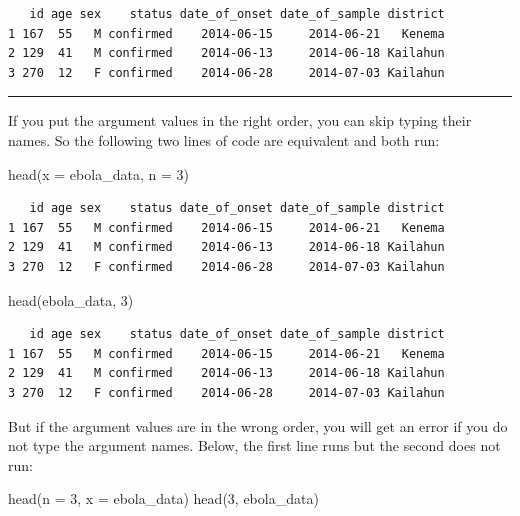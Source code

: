 \documentclass[
  letterpaper,
  DIV=11,
  numbers=noendperiod]{scrreprt}
\newenvironment{Shaded}{\begin{snugshade}}{\end{snugshade}}
\newcommand{\AttributeTok}[1]{\textcolor[rgb]{0.40,0.45,0.13}{#1}}
\newcommand{\DecValTok}[1]{\textcolor[rgb]{0.68,0.00,0.00}{#1}}
\newcommand{\FunctionTok}[1]{\textcolor[rgb]{0.28,0.35,0.67}{#1}}
\newcommand{\NormalTok}[1]{\textcolor[rgb]{0.00,0.23,0.31}{#1}}
\begin{document}
\begin{verbatim}
   id age sex    status date_of_onset date_of_sample district
1 167  55   M confirmed    2014-06-15     2014-06-21   Kenema
2 129  41   M confirmed    2014-06-13     2014-06-18 Kailahun
3 270  12   F confirmed    2014-06-28     2014-07-03 Kailahun
\end{verbatim}

\begin{center}\rule{0.5\linewidth}{0.5pt}\end{center}

If you put the argument values in the right order, you can skip typing
their names. So the following two lines of code are equivalent and both
run:

\begin{Shaded}
\begin{Highlighting}[]
\FunctionTok{head}\NormalTok{(}\AttributeTok{x =}\NormalTok{ ebola\_data, }\AttributeTok{n =} \DecValTok{3}\NormalTok{)}
\end{Highlighting}
\end{Shaded}

\begin{verbatim}
   id age sex    status date_of_onset date_of_sample district
1 167  55   M confirmed    2014-06-15     2014-06-21   Kenema
2 129  41   M confirmed    2014-06-13     2014-06-18 Kailahun
3 270  12   F confirmed    2014-06-28     2014-07-03 Kailahun
\end{verbatim}

\begin{Shaded}
\begin{Highlighting}[]
\FunctionTok{head}\NormalTok{(ebola\_data, }\DecValTok{3}\NormalTok{)}
\end{Highlighting}
\end{Shaded}

\begin{verbatim}
   id age sex    status date_of_onset date_of_sample district
1 167  55   M confirmed    2014-06-15     2014-06-21   Kenema
2 129  41   M confirmed    2014-06-13     2014-06-18 Kailahun
3 270  12   F confirmed    2014-06-28     2014-07-03 Kailahun
\end{verbatim}

But if the argument values are in the wrong order, you will get an error
if you do not type the argument names. Below, the first line runs but
the second does not run:

\begin{Shaded}
\begin{Highlighting}[]
\FunctionTok{head}\NormalTok{(}\AttributeTok{n =} \DecValTok{3}\NormalTok{, }\AttributeTok{x =}\NormalTok{ ebola\_data)}
\FunctionTok{head}\NormalTok{(}\DecValTok{3}\NormalTok{, ebola\_data)}
\end{Highlighting}
\end{Shaded}
\end{document}
